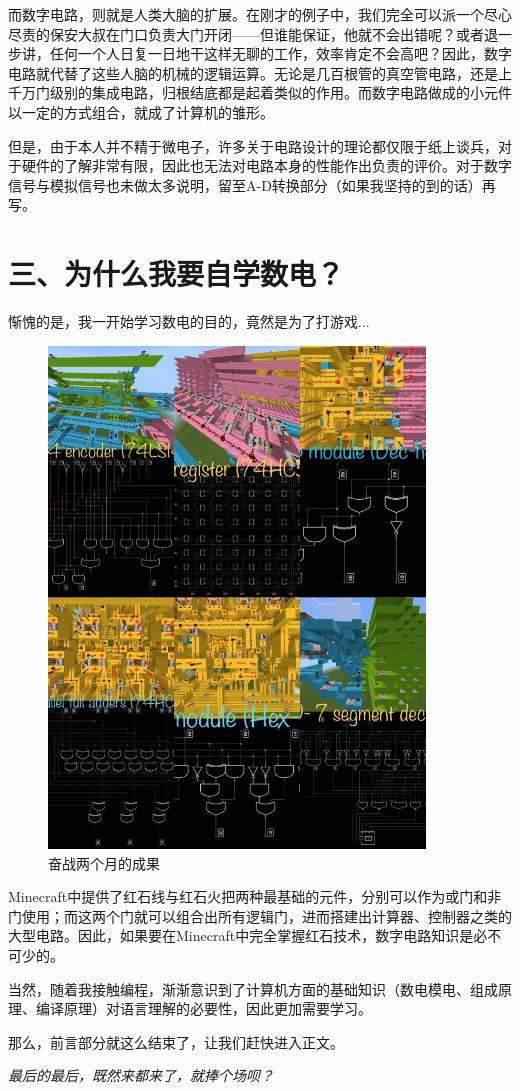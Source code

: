 \documentclass[UTF8]{ctexart}
\begin{document}
而数字电路，则就是人类大脑的扩展。在刚才的例子中，我们完全可以派一个尽心尽责的保安大叔在门口负责大门开闭——但谁能保证，他就不会出错呢？或者退一步讲，任何一个人日复一日地干这样无聊的工作，效率肯定不会高吧？因此，数字电路就代替了这些人脑的机械的逻辑运算。无论是几百根管的真空管电路，还是上千万门级别的集成电路，归根结底都是起着类似的作用。而数字电路做成的小元件以一定的方式组合，就成了计算机的雏形。

但是，由于本人并不精于微电子，许多关于电路设计的理论都仅限于纸上谈兵，对于硬件的了解非常有限，因此也无法对电路本身的性能作出负责的评价。对于数字信号与模拟信号也未做太多说明，留至A-D转换部分（如果我坚持的到的话）再写。

\section*{三、为什么我要自学数电？}
惭愧的是，我一开始学习数电的目的，竟然是为了打游戏...

\begin{figure}
\includegraphics[width=10cm]{Fig1.jpg}
\caption*{奋战两个月的成果}
\end{figure}
Minecraft中提供了红石线与红石火把两种最基础的元件，分别可以作为或门和非门使用；而这两个门就可以组合出所有逻辑门，进而搭建出计算器、控制器之类的大型电路。因此，如果要在Minecraft中完全掌握红石技术，数字电路知识是必不可少的。

当然，随着我接触编程，渐渐意识到了计算机方面的基础知识（数电模电、组成原理、编译原理）对语言理解的必要性，因此更加需要学习。

那么，前言部分就这么结束了，让我们赶快进入正文。

\textit{最后的最后，既然来都来了，就捧个场呗？}
\end{document}
